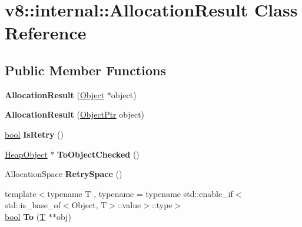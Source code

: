 \hypertarget{classv8_1_1internal_1_1AllocationResult}{}\section{v8\+:\+:internal\+:\+:Allocation\+Result Class Reference}
\label{classv8_1_1internal_1_1AllocationResult}
\subsection*{Public Member Functions}
\begin{DoxyCompactItemize}
\item 
\mbox{\label{classv8_1_1internal_1_1AllocationResult_a070cd4a633aea946bc22da35de4e20d3}} 
{\bfseries Allocation\+Result} (\mbox{\hyperlink{classv8_1_1internal_1_1Object}{Object}} $\ast$object)
\item 
\mbox{\label{classv8_1_1internal_1_1AllocationResult_a299d24749f6168f4ab26161ed122d2a4}} 
{\bfseries Allocation\+Result} (\mbox{\hyperlink{classv8_1_1internal_1_1ObjectPtr}{Object\+Ptr}} object)
\item 
\mbox{\label{classv8_1_1internal_1_1AllocationResult_a42620ae6917b2e46beb01e6d5ab1af9d}} 
\mbox{\hyperlink{classbool}{bool}} {\bfseries Is\+Retry} ()
\item 
\mbox{\label{classv8_1_1internal_1_1AllocationResult_a4e6e8ddf6aef058ff5bc1a703b619ffc}} 
\mbox{\hyperlink{classv8_1_1internal_1_1HeapObject}{Heap\+Object}} $\ast$ {\bfseries To\+Object\+Checked} ()
\item 
\mbox{\label{classv8_1_1internal_1_1AllocationResult_a112be2639d4a26bacacdd582fdd67feb}} 
Allocation\+Space {\bfseries Retry\+Space} ()
\item 
\mbox{\label{classv8_1_1internal_1_1AllocationResult_ad14fe185443ba1bbb7cfef95e4a9e3cb}} 
{\footnotesize template$<$typename T , typename  = typename std\+::enable\+\_\+if$<$                            std\+::is\+\_\+base\+\_\+of$<$\+Object, T$>$\+::value$>$\+::type$>$ }\\\mbox{\hyperlink{classbool}{bool}} {\bfseries To} (\mbox{\hyperlink{classv8_1_1internal_1_1torque_1_1T}{T}} $\ast$$\ast$obj)
$$
\end{DoxyCompactItemize}
